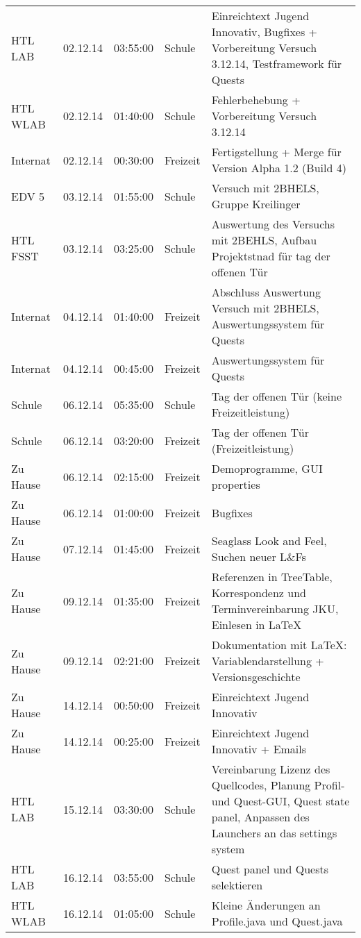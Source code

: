 \begin{small}
\begin{longtable}{ p{} p{} p{} p{} p{}}
HTL LAB	& 02.12.14	& 03:55:00	& Schule	& Einreichtext Jugend Innovativ, Bugfixes + Vorbereitung Versuch 3.12.14, Testframework f\"ur Quests \\
HTL WLAB	& 02.12.14	& 01:40:00	& Schule	& Fehlerbehebung + Vorbereitung Versuch 3.12.14 \\
Internat	& 02.12.14	& 00:30:00	& Freizeit	& Fertigstellung + Merge f\"ur Version Alpha 1.2 (Build 4) \\
EDV 5	& 03.12.14	& 01:55:00	& Schule	& Versuch mit 2BHELS, Gruppe Kreilinger \\
HTL FSST	& 03.12.14	& 03:25:00	& Schule	& Auswertung des Versuchs mit 2BEHLS, Aufbau Projektstnad f\"ur tag der offenen T\"ur \\
Internat	& 04.12.14	& 01:40:00	& Freizeit	& Abschluss Auswertung Versuch mit 2BHELS, Auswertungssystem f\"ur Quests \\
Internat	& 04.12.14	& 00:45:00	& Freizeit	& Auswertungssystem f\"ur Quests \\
Schule	& 06.12.14	& 05:35:00	& Schule	& Tag der offenen T\"ur (keine Freizeitleistung) \\
Schule	& 06.12.14	& 03:20:00	& Freizeit	& Tag der offenen T\"ur (Freizeitleistung) \\
Zu Hause	& 06.12.14	& 02:15:00	& Freizeit	& Demoprogramme, GUI properties \\
Zu Hause	& 06.12.14	& 01:00:00	& Freizeit	& Bugfixes \\
Zu Hause	& 07.12.14	& 01:45:00	& Freizeit	& Seaglass Look and Feel, Suchen neuer L\&{}Fs \\
Zu Hause	& 09.12.14	& 01:35:00	& Freizeit	& Referenzen in TreeTable, Korrespondenz und Terminvereinbarung JKU, Einlesen in LaTeX \\
Zu Hause	& 09.12.14	& 02:21:00	& Freizeit	& Dokumentation mit LaTeX: Variablendarstellung + Versionsgeschichte \\
Zu Hause	& 14.12.14	& 00:50:00	& Freizeit	& Einreichtext Jugend Innovativ \\
Zu Hause	& 14.12.14	& 00:25:00	& Freizeit	& Einreichtext Jugend Innovativ + Emails \\
HTL LAB	& 15.12.14	& 03:30:00	& Schule	& Vereinbarung Lizenz des Quellcodes, Planung Profil- und Quest-GUI, Quest state panel, Anpassen des Launchers an das settings system \\
HTL LAB	& 16.12.14	& 03:55:00	& Schule	& Quest panel und Quests selektieren \\
HTL WLAB	& 16.12.14	& 01:05:00	& Schule	& Kleine \"Anderungen an Profile.java und Quest.java \\

\end{longtable}
\end{small}
